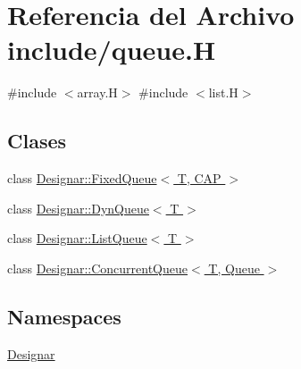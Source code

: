 \hypertarget{queue_8_h}{}\section{Referencia del Archivo include/queue.H}
\label{queue_8_h}
{\ttfamily \#include $<$array.\+H$>$}\newline
{\ttfamily \#include $<$list.\+H$>$}\newline
\subsection*{Clases}
\begin{DoxyCompactItemize}
\item 
class \hyperlink{class_designar_1_1_fixed_queue}{Designar\+::\+Fixed\+Queue$<$ T, C\+A\+P $>$}
\item 
class \hyperlink{class_designar_1_1_dyn_queue}{Designar\+::\+Dyn\+Queue$<$ T $>$}
\item 
class \hyperlink{class_designar_1_1_list_queue}{Designar\+::\+List\+Queue$<$ T $>$}
\item 
class \hyperlink{class_designar_1_1_concurrent_queue}{Designar\+::\+Concurrent\+Queue$<$ T, Queue $>$}
\end{DoxyCompactItemize}
\subsection*{Namespaces}
\begin{DoxyCompactItemize}
\item 
 \hyperlink{namespace_designar}{Designar}
\end{DoxyCompactItemize}
